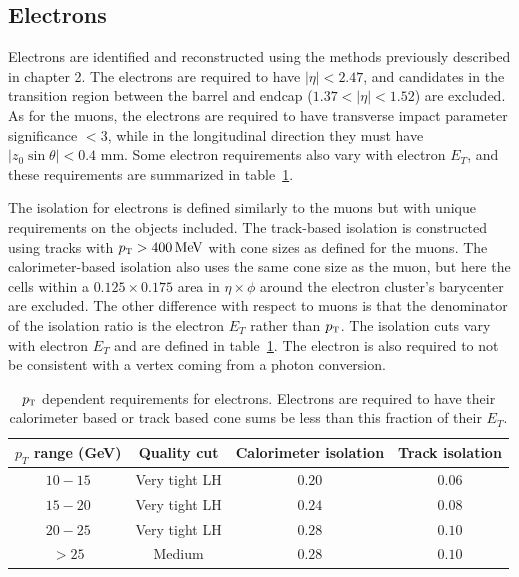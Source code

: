 \subsection{Electrons}

Electrons are identified and reconstructed using the methods previously described in chapter 2. The electrons are required to have $|\eta| < 2.47$, and candidates in the transition region between the barrel and endcap ($1.37 < |\eta| < 1.52$) are excluded. As for the muons, the electrons are required to have transverse impact parameter significance $ < 3$, while in the longitudinal direction they must have $|z_0 \sin \theta| < 0.4$ mm. Some electron requirements also vary with electron $E_{T}$, and these requirements are summarized in table~\ref{tab:elecselec}.

The isolation for electrons is defined similarly to the muons but with unique requirements on the objects included. The track-based isolation is constructed using tracks with $\pT > 400 \MeV$ with cone sizes as defined for the muons. The calorimeter-based isolation also uses the same cone size as the muon, but here the cells within a $0.125 \times 0.175$ area in $\eta \times \phi$ around the electron cluster's barycenter are excluded. The other difference with respect to muons is that the denominator of the isolation ratio is the electron $E_{T}$ rather than $p_{\textrm{\footnotesize\sc t}}$. The isolation cuts vary with electron $E_{T}$ and are defined in table~\ref{tab:elecselec}. The electron is also required to not be consistent with a vertex coming from a photon conversion. 


\begin{table}[h!]
\centering
\captionsetup{justification=centering}

\hspace{-10pt}
\begin{tabular}{|c|c|c|c|}
\hline
$p_T$ range (GeV) & Quality cut & Calorimeter isolation & Track isolation\\ \hline \hline
$10-15$ & Very tight LH & $0.20$ & $0.06$ \\ \hline
$15-20$ & Very tight LH & $0.24$ & $0.08$ \\ \hline
$20-25$ & Very tight LH & $0.28$ & $0.10$ \\ \hline
$> 25$ & Medium & $0.28$ & $0.10$ \\ \hline
\end{tabular}

\caption{
$p_{\textrm{\footnotesize\sc t}}$ dependent requirements for electrons. Electrons are required to have their calorimeter based or track based cone sums be less than this fraction of their $E_{T}$.
}
\label{tab:elecselec}
\end{table}

